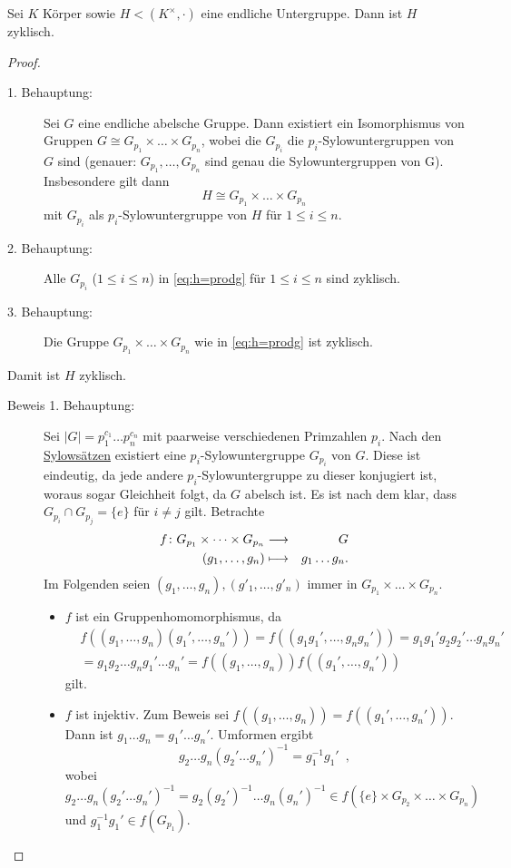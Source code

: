 \documentclass[12pt,a4paper]{scrartcl}
\begin{document}
\begin{satz}\label{thm:17.3}
	Sei $K$ Körper sowie $H<(K^{\times},\cdot)$ eine endliche Untergruppe. Dann ist $H$ zyklisch.
\end{satz}
\begin{proof}
	\leavevmode
	\begin{description}
		\item[1. Behauptung:] Sei $G$ eine endliche abelsche Gruppe. Dann existiert ein Isomorphismus von Gruppen $G\cong G_{p_1}\times\dots\times G_{p_n}$, wobei die $G_{p_i}$ die $p_i$-Sylowuntergruppen von $G$ sind (genauer: $G_{p_1},\dots,G_{p_n}$ sind genau die Sylowuntergruppen von G). Insbesondere gilt dann
		\begin{equation}
			H\cong G_{p_1}\times\dots\times G_{p_n} \tag{*}\label{eq:h=prodg}
		\end{equation}
		mit $G_{p_i}$ als $p_i$-Sylowuntergruppe von $H$ für $1\le i \le n$.
		\item[2. Behauptung:] Alle $G_{p_i}$ ($1\leq i\leq n$) in \eqref{eq:h=prodg} für $1\le i\le  n$ sind zyklisch.
		\item[3. Behauptung:] Die Gruppe $G_{p_1}\times\dots\times G_{p_n}$ wie in \eqref{eq:h=prodg} ist zyklisch.
	\end{description}
	Damit ist $H$ zyklisch.
	\begin{description}
		\item[Beweis 1. Behauptung:] Sei $|G| = p_1^{c_1}\dots p_n^{c_n}$ mit paarweise verschiedenen Primzahlen $p_i$. Nach den \hyperref[thm:sylow]{Sylowsätzen} existiert eine $p_i$-Sylowuntergruppe $G_{p_i}$ von $G$. Diese ist eindeutig, da jede andere $p_i$-Sylowuntergruppe zu dieser konjugiert ist, woraus sogar Gleichheit folgt, da $G$ abelsch ist. Es ist nach dem  klar, dass $G_{p_i}\cap G_{p_j} = \{e\}$ für $i\neq j$ gilt. Betrachte
		\begin{eqnarray*}
			f\colon G_{p_1}\times\dots\times G_{p_n} & \longrightarrow & G\\
			(g_1,\dots, g_n) & \longmapsto & g_1\dots g_n.
		\end{eqnarray*}
		Im Folgenden seien $(g_1,\dots,g_n),(g'_1,\dots,g'_n)$ immer in $G_{p_1}\times\dots\times G_{p_n}$.
		\begin{itemize}
			\item $f$ ist ein Gruppenhomomorphismus, da \begin{align*}&f((g_1,\dots, g_n)(g_1',\dots, g_n')) = f((g_1g_1',\dots, g_ng_n')) = g_1g_1'g_2g_2'\dots g_ng_n'\\ &= g_1g_2\dots g_ng_1'\dots g_n' = f((g_1,\dots, g_n))f((g_1',\dots, g_n'))\end{align*} gilt.
			\item $f$ ist injektiv. Zum Beweis sei $f((g_1,\dots, g_n)) = f((g_1',\dots, g_n'))$. Dann ist $g_1\dots g_n = g_1'\dots g_n'$. Umformen ergibt
			\[ g_2\dots g_n(g_2'\dots g_n')^{-1} = g_1^{-1}g_1'\enspace,\]
			wobei $g_2\dots g_n(g_2'\dots g_n')^{-1}  = g_2(g_2')^{-1}\dots g_n(g_n')^{-1}\in f(\{e\}\times G_{p_2}\times \dots \times G_{p_n})$ und $g_1^{-1}g_1'\in f(G_{p_1})$.
			

\end{itemize}
\end{description}
\end{proof}
\end{document}
